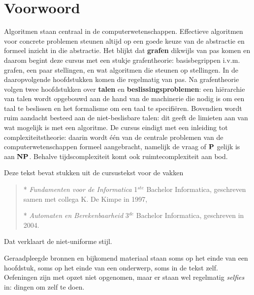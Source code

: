 \chapter{Voorwoord}


Algoritmen staan centraal in de computerwetenschappen. Effectieve
algoritmen voor concrete problemen steunen altijd op een goede keuze
van de abstractie en formeel inzicht in die abstractie. Het blijkt dat
{\bf grafen} dikwijls van pas komen en daarom begint deze cursus met
een stukje grafentheorie: basisbegrippen i.v.m. grafen, een paar
stellingen, en wat algoritmen die steunen op stellingen. In de
daaropvolgende hoofdstukken komen die regelmatig van pas. Na
grafentheorie volgen twee hoofdstukken over {\bf talen} en {\bf
beslissingsproblemen}: een hi\"erarchie van talen wordt opgebouwd aan
de hand van de machinerie die nodig is om een taal te beslissen en het
formalisme om een taal te specifi\"eren. Bovendien wordt ruim aandacht
besteed aan de niet-beslisbare talen: dit geeft de limieten aan van
wat mogelijk is met een algoritme. De cursus eindigt met een inleiding
tot complexiteitstheorie: daarin wordt \'{e}\'{e}n van de centrale
problemen van de computerwetenschappen formeel aangebracht, namelijk
de vraag of $\P$ gelijk is aan $\NP$. Behalve tijdscomplexiteit komt
ook ruimtecomplexiteit aan bod. 


Deze tekst bevat stukken uit de cursustekst voor de vakken
\begin{verse}
* {\em Fundamenten voor de Informatica} 1$^{ste}$ Bachelor
Informatica, geschreven samen met collega K. De Kimpe in 1997,

* {\em Automaten en Berekenbaarheid} 3$^{de}$ Bachelor Informatica, geschreven in 2004.
\end{verse}
Dat verklaart de niet-uniforme stijl.

Geraadpleegde bronnen en bijkomend materiaal staan soms op het einde
van een hoofdstuk, soms op het einde van een onderwerp, soms in de
tekst zelf. Oefeningen zijn met opzet niet opgenomen, maar er staan
wel regelmatig {\em selfies} in: dingen om zelf te doen.
